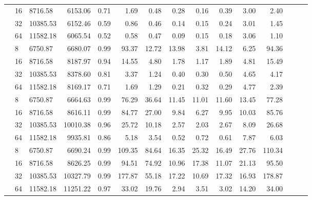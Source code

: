 \begin{table}
{\begin{tabular}{lllrrrrrrrrrrrr}
                             & 16 & 8716.58  & 6153.06   & 0.71   & 1.69   & 0.48   & 0.28  & 0.16  & 0.39  & 3.00  & 2.40            \\
                             & 32 & 10385.53 & 6152.46   & 0.59   & 0.86   & 0.46   & 0.14  & 0.15  & 0.24  & 3.01  & 1.45            \\
                             & 64 & 11582.18 & 6065.54   & 0.52   & 0.58   & 0.47   & 0.09  & 0.15  & 0.18  & 3.06  & 1.10            \\
                    \addlinespace
                    48       & 8  & 6750.87  & 6680.07   & 0.99   & 93.37  & 12.72  & 13.98 & 3.81  & 14.12 & 6.25  & 94.36           \\
                             & 16 & 8716.58  & 8187.97   & 0.94   & 14.55  & 4.80   & 1.78  & 1.17  & 1.89  & 4.81  & 15.49           \\
                             & 32 & 10385.53 & 8378.60   & 0.81   & 3.37   & 1.24   & 0.40  & 0.30  & 0.50  & 4.65  & 4.17            \\
                             & 64 & 11582.18 & 8169.17   & 0.71   & 1.69   & 1.29   & 0.21  & 0.32  & 0.29  & 4.77  & 2.39            \\
                    \addlinespace
                    96       & 8  & 6750.87  & 6664.63   & 0.99   & 76.29  & 36.64  & 11.45 & 11.01 & 11.60 & 13.45 & 77.28           \\
                             & 16 & 8716.58  & 8616.11   & 0.99   & 84.77  & 27.00  & 9.84  & 6.27  & 9.95  & 10.03 & 85.76           \\
                             & 32 & 10385.53 & 10010.38  & 0.96   & 25.72  & 10.18  & 2.57  & 2.03  & 2.67  & 8.09  & 26.68           \\
                             & 64 & 11582.18 & 9935.81   & 0.86   & 5.18   & 3.54   & 0.52  & 0.72  & 0.61  & 7.87  & 6.03            \\
                    \addlinespace
                    192      & 8  & 6750.87  & 6690.24   & 0.99   & 109.35 & 84.64  & 16.35 & 25.32 & 16.49 & 27.76 & 110.34          \\
                             & 16 & 8716.58  & 8626.25   & 0.99   & 94.51  & 74.92  & 10.96 & 17.38 & 11.07 & 21.13 & 95.50           \\
                             & 32 & 10385.53 & 10327.79  & 0.99   & 177.87 & 55.18  & 17.22 & 10.69 & 17.32 & 16.93 & 178.87          \\
                             & 64 & 11582.18 & 11251.22  & 0.97   & 33.02  & 19.76  & 2.94  & 3.51  & 3.02  & 14.20 & 34.00           \\

\end{tabular}}
\end{table}
